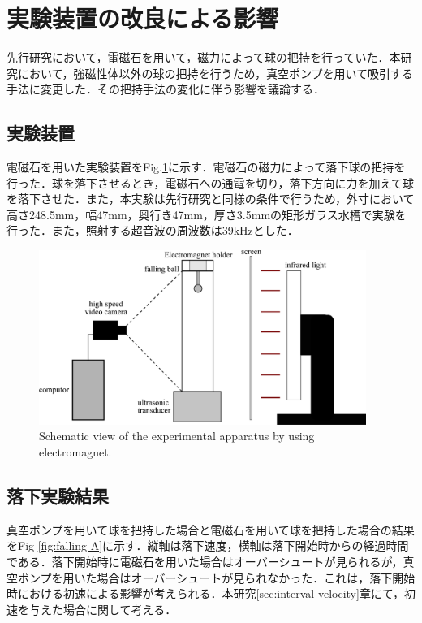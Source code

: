 \section{実験装置の改良による影響}
\label{sec:reexp}
先行研究\cite{ref:8}において，電磁石を用いて，磁力によって球の把持を行っていた．本研究において，強磁性体以外の球の把持を行うため，真空ポンプを用いて吸引する手法に変更した．その把持手法の変化に伴う影響を議論する．

\subsection{実験装置}

電磁石を用いた実験装置をFig.\ref{fig:magnet_device}に示す．電磁石の磁力によって落下球の把持を行った．球を落下させるとき，電磁石への通電を切り，落下方向に力を加えて球を落下させた．また，本実験は先行研究と同様の条件で行うため，外寸において高さ248.5mm，幅47mm，奥行き47mm，厚さ3.5mmの矩形ガラス水槽で実験を行った．また，照射する超音波の周波数は39kHzとした．

\begin{figure}[H]
    \centering
    \includegraphics[width=0.95\textwidth]{X-Appendix/device/magnet_device.eps}
    \caption{Schematic view of the experimental apparatus by using electromagnet.}
    \label{fig:magnet_device}
\end{figure}

\subsection{落下実験結果}
真空ポンプを用いて球を把持した場合と電磁石を用いて球を把持した場合の結果をFig \ref{fig:falling-A}に示す．縦軸は落下速度，横軸は落下開始時からの経過時間である．落下開始時に電磁石を用いた場合はオーバーシュートが見られるが，真空ポンプを用いた場合はオーバーシュートが見られなかった．これは，落下開始時における初速による影響が考えられる．本研究\ref{sec:interval-velocity}章にて，初速を与えた場合に関して考える．

